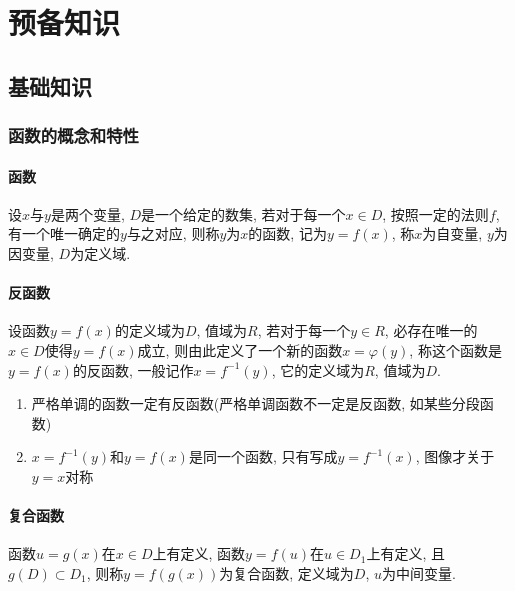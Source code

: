 \chapter{预备知识}
\section{基础知识}
\subsection{函数的概念和特性}
\subsubsection{函数}
设$ x $与$ y $是两个变量, $ D $是一个给定的数集, 若对于每一个$ x\in D $, 按照一定的法则$ f $, 有一个唯一确定的$ y $与之对应, 则称$ y $为$ x $的函数, 记为$ y=f(x) $, 称$ x $为自变量, $ y $为因变量, $ D $为定义域.
\subsubsection{反函数}
设函数$ y=f(x) $的定义域为$ D $, 值域为$ R $, 若对于每一个$ y\in R $, 必存在唯一的$ x\in D $使得$ y=f(x) $成立, 则由此定义了一个新的函数$ x=\varphi(y) $, 称这个函数是$ y=f(x) $的反函数, 一般记作$ x=f^{-1}(y) $, 它的定义域为$ R $, 值域为$ D $. \par
\begin{tcolorbox}
    \begin{enumerate}
        \item 严格单调的函数一定有反函数(严格单调函数不一定是反函数, 如某些分段函数)
        \item $ x=f^{-1}(y) $和$ y=f(x) $是同一个函数, 只有写成$ y=f^{-1}(x) $, 图像才关于$ y=x $对称
    \end{enumerate}
\end{tcolorbox}
\subsubsection{复合函数}
函数$ u=g(x) $在$ x\in D $上有定义, 函数$ y=f(u) $在$ u\in D_{1} $上有定义, 且$ g(D)\subset D_{1} $, 则称$ y=f(g(x)) $为复合函数, 定义域为$ D $, $ u $为中间变量.
